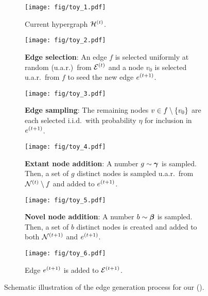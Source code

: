 \begin{figure*}[!ht]

\begin{subfigure}[t]{0.3\textwidth}
    \texttt{[image: fig/toy\_1.pdf]}
    \caption{Current hypergraph $\at{\cH}{t}$.}
\end{subfigure}\hspace{\fill} %
\begin{subfigure}[t]{0.3\textwidth}
    \texttt{[image: fig/toy\_2.pdf]}
    \caption{\textbf{Edge selection}: An edge $f$ is selected uniformly at random (u.a.r.)\ from $\mathcal{E}^{(t)}$ and a node $v_0$ is selected u.a.r.\ from $f$ to seed the new edge $e^{(t+1)}$.}
\end{subfigure}\hspace{\fill}
\begin{subfigure}[t]{0.3\textwidth}
    \texttt{[image: fig/toy\_3.pdf]}
    \caption{\textbf{Edge sampling}: The remaining nodes $v \in f \setminus \left\{v_0\right\}$ are each selected i.i.d.\ with probability $\eta$ for inclusion in $e^{(t+1)}$.}
\end{subfigure}

\bigskip %
\begin{subfigure}[t]{0.3\textwidth}
    \texttt{[image: fig/toy\_4.pdf]}
    \caption{\textbf{Extant node addition}: A number $g \sim \boldsymbol{\gamma}$ is sampled. Then, a set of $g$ distinct nodes is sampled u.a.r.\ from $\mathcal{N}^{(t)} \setminus f$ and added to $e^{(t+1)}$.}
\end{subfigure}\hspace{\fill} %
\begin{subfigure}[t]{0.3\textwidth}
    \texttt{[image: fig/toy\_5.pdf]}
    \caption{\textbf{Novel node addition}: A number $b \sim \boldsymbol{\beta}$ is sampled. Then, a set of $b$ distinct nodes is created and added to both $\mathcal{N}^{(t+1)}$ and $e^{(t+1)}$.}
\end{subfigure}\hspace{\fill}
\begin{subfigure}[t]{0.3\textwidth}
    \texttt{[image: fig/toy\_6.pdf]}
    \caption{Edge $e^{(t+1)}$ is added to $\mathcal{E}^{(t+1)}$.}
\end{subfigure}

\caption{Schematic illustration of the edge generation process for our \Model (\model).}
\label{fig:toy-model}
\end{figure*}

